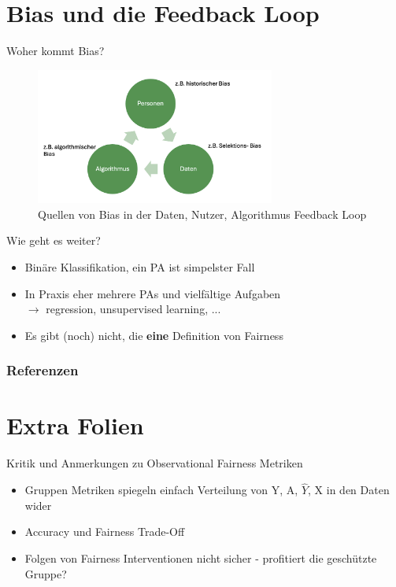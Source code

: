 \documentclass[aspectratio=169]{beamer}
\begin{document}
\section{Bias und die Feedback Loop}
\begin{frame}{Woher kommt Bias?}
	\begin{figure}
		\centering
		\includegraphics[width=0.7\textwidth]{../figures/bias_loop.png}
		\caption{Quellen von Bias in der Daten, Nutzer, Algorithmus Feedback Loop \cite{mehrabi2022}}
	\end{figure}
\end{frame}

\begin{frame}{Wie geht es weiter?}
	\begin{itemize}
		\item<1-> Binäre Klassifikation, ein PA ist simpelster Fall
		\item<2-> In Praxis eher mehrere PAs und vielfältige Aufgaben\\ $\rightarrow$ regression, unsupervised learning, ...
		\item<3-> Es gibt (noch) nicht, die \textbf{eine} Definition von Fairness
	\end{itemize}
\end{frame}

\begin{frame}[allowframebreaks]
	\frametitle{Referenzen}
	\printbibliography
\end{frame}

\section{Extra Folien}

\begin{frame}{Kritik und Anmerkungen zu Observational Fairness Metriken}
	\begin{itemize}
		\item Gruppen Metriken spiegeln einfach Verteilung von Y, A, $\hat{Y}$, X in den Daten wider \cite{corbett-davies}
		\item Accuracy und Fairness Trade-Off
		\item Folgen von Fairness Interventionen nicht sicher - profitiert die geschützte Gruppe?
	\end{itemize}
\end{frame}
\end{document}
